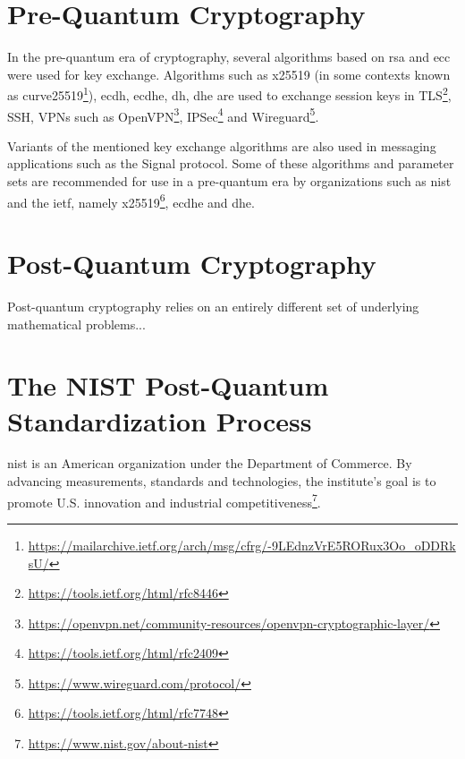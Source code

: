 \section{Pre-Quantum Cryptography}
\label{section:background:pre-quantum}

In the pre-quantum era of cryptography, several algorithms based on \gls{rsa} and \gls{ecc} were used for key exchange. Algorithms such as \gls{x25519} (in some contexts known as \gls{curve25519}\footnote{\href{https://mailarchive.ietf.org/arch/msg/cfrg/-9LEdnzVrE5RORux3Oo\_oDDRksU/}{https://mailarchive.ietf.org/arch/msg/cfrg/-9LEdnzVrE5RORux3Oo\_oDDRksU/}}), \gls{ecdh}, \gls{ecdhe}, \gls{dh}, \gls{dhe} are used to exchange session keys in TLS\footnote{\href{https://tools.ietf.org/html/rfc8446}{https://tools.ietf.org/html/rfc8446}}, SSH\cite{williams2011}, VPNs such as OpenVPN\footnote{\href{https://openvpn.net/community-resources/openvpn-cryptographic-layer/}{https://openvpn.net/community-resources/openvpn-cryptographic-layer/}}, IPSec\footnote{\href{https://tools.ietf.org/html/rfc2409}{https://tools.ietf.org/html/rfc2409}} and Wireguard\footnote{\href{https://www.wireguard.com/protocol/}{https://www.wireguard.com/protocol/}}.

Variants of the mentioned key exchange algorithms are also used in messaging applications such as the Signal protocol\cite{gordon2017}. Some of these algorithms and parameter sets are recommended for use in a pre-quantum era by organizations such as \gls{nist} and the \gls{ietf}, namely \gls{x25519}\footnote{\href{https://tools.ietf.org/html/rfc7748}{https://tools.ietf.org/html/rfc7748}}, \gls{ecdhe}\cite{nist2019} and \gls{dhe}\cite{nist2019}.

\section{Post-Quantum Cryptography}

Post-quantum cryptography relies on an entirely different set of underlying mathematical problems...

\section{The NIST Post-Quantum Standardization Process}
\gls{nist} is an American organization under the Department of Commerce. By advancing measurements, standards and technologies, the institute's goal is to promote U.S. innovation and industrial competitiveness\footnote{\href{https://www.nist.gov/about-nist}{https://www.nist.gov/about-nist}}.


